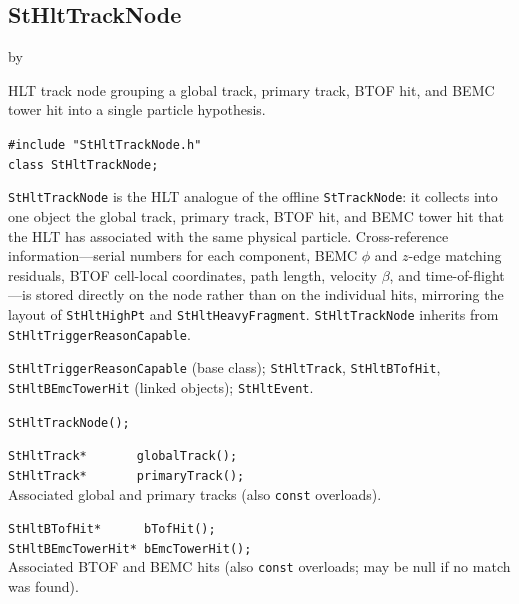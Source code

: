\documentclass[twoside]{article}
\newcommand{\entrylabel}[1]{\mbox{\textbf{{#1}}}\hfil}%
\newenvironment{entry}
{\begin{list}{}%
    {\renewcommand{\makelabel}{\entrylabel}%
     \setlength{\labelwidth}{90pt}%
     \setlength{\leftmargin}{\labelwidth}
     \advance\leftmargin by \labelsep%
      }%
    }%
  {\end{list}}
\newcommand{\Entrylabel}[1]%
{\raisebox{0pt}[1ex][0pt]{\makebox[\labelwidth][l]%
    {\parbox[t]{\labelwidth}{\hspace{0pt}\textbf{{#1}}}}}}
\newenvironment{Entry}%
{\renewcommand{\entrylabel}{\Entrylabel}\begin{entry}}%
  {\end{entry}}
\begin{document}
\subsection{StHltTrackNode}
\label{sec:StHltTrackNode}
\begin{Entry}
\item[Summary] HLT track node grouping a global track, primary track,
    BTOF hit, and BEMC tower hit into a single particle hypothesis.
\item[Synopsis]
    \verb+#include "StHltTrackNode.h"+\\
    \verb+class StHltTrackNode;+\\
\item[Description]
    \texttt{StHltTrackNode} is the HLT analogue of the offline
    \texttt{StTrackNode}: it collects into one object the global track,
    primary track, BTOF hit, and BEMC tower hit that the HLT has
    associated with the same physical particle.  Cross-reference
    information---serial numbers for each component, BEMC $\phi$ and
    $z$-edge matching residuals, BTOF cell-local coordinates, path
    length, velocity $\beta$, and time-of-flight---is stored directly
    on the node rather than on the individual hits, mirroring the
    layout of \texttt{StHltHighPt} and \texttt{StHltHeavyFragment}.
    \texttt{StHltTrackNode} inherits from
    \texttt{StHltTriggerReasonCapable}.
\item[Related Classes]
    \texttt{StHltTriggerReasonCapable} (base class);
    \texttt{StHltTrack}, \texttt{StHltBTofHit},
    \texttt{StHltBEmcTowerHit} (linked objects);
    \texttt{StHltEvent}.
\item[Public\\ Constructors]
    \verb+StHltTrackNode();+\\
\item[Public Member\\ Functions]
    \verb+StHltTrack*       globalTrack();+\\
    \verb+StHltTrack*       primaryTrack();+\\
    Associated global and primary tracks (also \texttt{const} overloads).

    \verb+StHltBTofHit*      bTofHit();+\\
    \verb+StHltBEmcTowerHit* bEmcTowerHit();+\\
    Associated BTOF and BEMC hits (also \texttt{const} overloads; may
    be null if no match was found).


\end{Entry}
\end{document}
